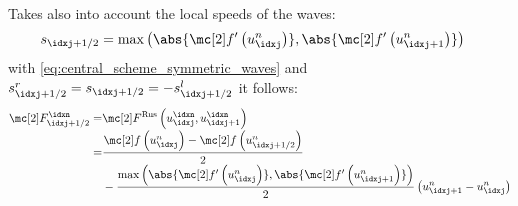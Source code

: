 \begin{defnbox}\nospacing
    \begin{defn}\label{defn:Rusanov_local_friedrichs_scheme}\leavevmode\\
        Takes also into account the local speeds of the waves:
        \begin{align}
          s_{\idxj+1/2}=\max \left(\abs{\flux'\left(u_{\idxj}^{n}\right)},\abs{\flux'\left(u_{\idxj+1}^{n}\right)}\right)&&
        \end{align}
        with \cref{eq:central_scheme_symmetric_waves} and $s_{\idxj+1/2}^{r}=s_{\idxj+1/2}=-s_{\idxj+1/2}^{l}$ it follows:
        \begin{align}
          \Flux_{\idxj+1/2}^{\idxn}=&\Flux^{\text{Rus}}\left(u^{\idxn}_{\idxj},u^{\idxn}_{\idxj+1}\right)\\[-1\jot]
                                   =&\frac{\flux\left(u_{\idxj}^{n}\right)-\flux \left(u_{\idxj+1/2}^{n}\right)}{2}\\[-1\jot]
          &-\frac{\max \left(\abs{\flux'\left(u_{\idxj}^{n}\right)},\abs{\flux'\left(u_{\idxj+1}^{n}\right)}\right)}{2}\left(u_{\idxj+1}^{n}-u_{\idxj}^{n}\right)\nonumber
        \end{align}
    \end{defn}
\end{defnbox}

